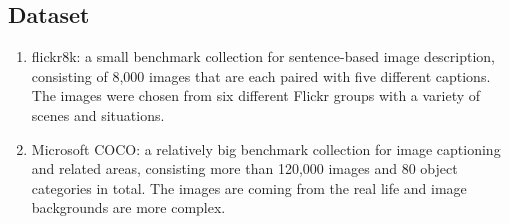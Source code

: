 \documentclass{article}
\begin{document}
\subsection{Dataset}
\begin{enumerate}
\item flickr8k: a small benchmark collection for sentence-based image description, consisting of 8,000 images that are each paired with five different captions. The images were chosen from six different Flickr groups with a variety of scenes and situations.
\item Microsoft COCO: a relatively big benchmark collection for image captioning and related areas, consisting more than 120,000 images and 80 object categories in total. The images are coming from the real life and image backgrounds are more complex.
\end{enumerate}
\end{document}
